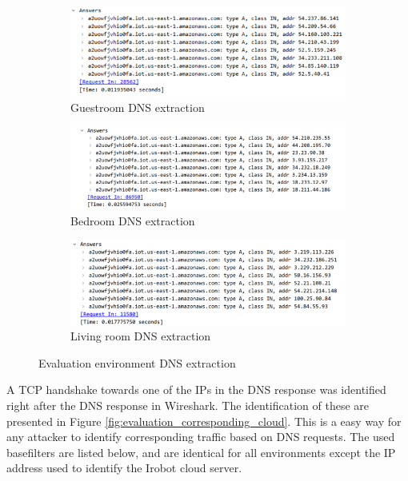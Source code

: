 \begin{figure}[H]
    \centering
    \begin{subfigure}{0.80\textwidth}
        \centering
        \includegraphics[width=\linewidth]{figures/Evaluation_dns_extraction 1.png}
        \caption{Guestroom DNS extraction}
        \label{fig:Evaluation_DNSextraction_1}
    \end{subfigure}
    \hfill
    \begin{subfigure}{0.80\textwidth}
        \centering
        \includegraphics[width=\linewidth]{figures/Evaluation_dns_extraction 2.png}
        \caption{Bedroom DNS extraction}
        \label{fig:Evaluation_DNSextraction_2}
    \end{subfigure}
    \hfill
    \begin{subfigure}{0.80\textwidth}
        \centering
        \includegraphics[width=\linewidth]{figures/Evaluation_dns_extraction 3.png}
        \caption{Living room DNS extraction}
        \label{fig:Evaluation_DNSextraction_3}
    \end{subfigure}
    \caption{Evaluation environment DNS extraction}
    \label{fig:Evaluation_DNSExtraction}
\end{figure}

 A TCP handshake towards one of the IPs in the DNS response was identified right after the DNS response in Wireshark. The identification of these are presented in Figure \ref{fig:evaluation_corresponding_cloud}. This is a easy way for any attacker to identify corresponding traffic based on DNS requests. The used basefilters are listed below, and are identical for all environments except the IP address used to identify the Irobot cloud server. 

